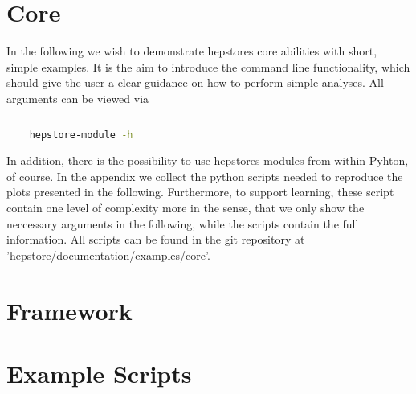 

\chapter{Core}

In the following we wish to demonstrate hepstores core abilities with
short, simple examples. It is the aim to introduce the command line
functionality, which should give the user a clear guidance on how to
perform simple analyses. All arguments can be viewed via
%
\begin{changemargin}{1.5cm}{1.5cm} 
  \begin{lstlisting}[language=Bash]
    
    hepstore-module -h
  \end{lstlisting}
\end{changemargin}
%
In addition, there is the possibility to use hepstores modules from
within Pyhton, of course. In the appendix we collect the python
scripts needed to reproduce the plots presented in the
following. Furthermore, to support learning, these script contain one
level of complexity more in the sense, that we only show the
neccessary arguments in the following, while the scripts contain the
full information. All scripts can be found in the git repository at
'hepstore/documentation/examples/core'.






\chapter{Framework}



\chapter{Example Scripts}

